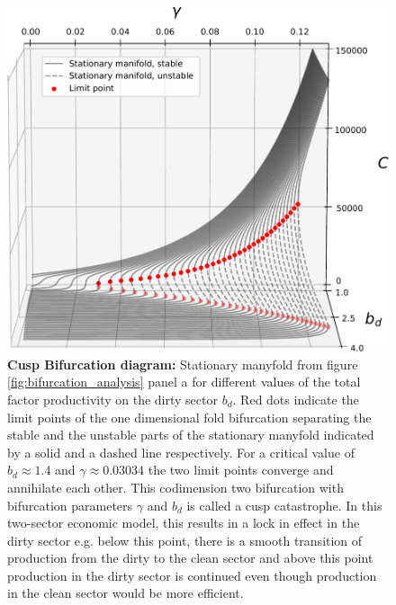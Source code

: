 \begin{figure}[ht!]
\centering\includegraphics[width=\linewidth]{figures/cusp_better.pdf}
\caption{\textbf{Cusp Bifurcation diagram:}
Stationary manyfold from figure \ref{fig:bifurcation_analysis} panel a for different values of the total factor productivity on the dirty sector $b_d$. Red dots indicate the limit points of the one dimensional fold bifurcation separating the stable and the unstable parts of the stationary manyfold indicated by a solid and a dashed line respectively. For a critical value of $b_d \approx 1.4$ and $\gamma \approx 0.03034$ the two limit points converge and annihilate each other. This codimension two bifurcation with bifurcation parameters $\gamma$ and $b_d$ is called a cusp catastrophe. In this two-sector economic model, this results in a lock in effect in the dirty sector e.g. below this point, there is a smooth transition of production from the dirty to the clean sector and above this point production in the dirty sector is continued even though production in the clean sector would be more efficient. \label{fig:cusp}}
\end{figure}

